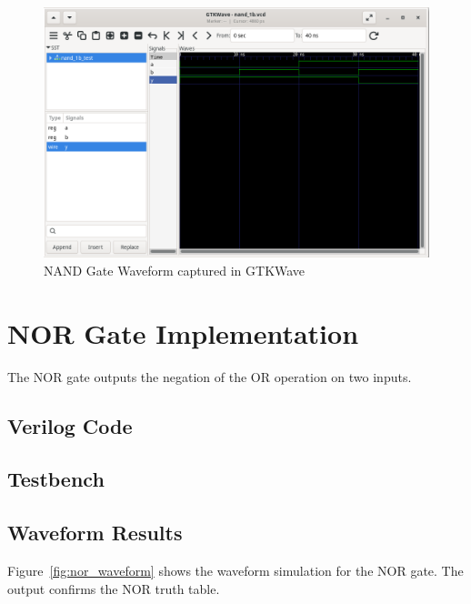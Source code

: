 \documentclass[12pt]{report}
\begin{document}
\begin{figure}[H]
    \centering
    \includegraphics[width=1.0\textwidth]{figs/NAND_GATE_WAVEFORM.png}
    \caption{NAND Gate Waveform captured in GTKWave}
    \label{fig:nand_waveform}
\end{figure}

\chapter{NOR Gate Implementation}

The NOR gate outputs the negation of the OR operation on two inputs.

\section{Verilog Code}



\section{Testbench}



\section{Waveform Results}

Figure~\ref{fig:nor_waveform} shows the waveform simulation for the NOR gate. The output confirms the NOR truth table.
\end{document}
